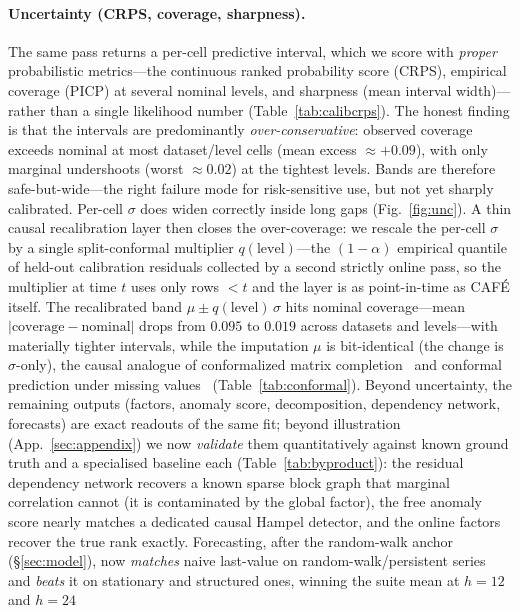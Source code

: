 \documentclass[10pt,twocolumn]{article}
\newcommand{\cafe}{CAF\'E}
\begin{document}
\paragraph{Uncertainty (CRPS, coverage, sharpness).} The same pass returns a
per-cell predictive interval, which we score with \emph{proper} probabilistic
metrics---the continuous ranked probability score (CRPS), empirical coverage
(PICP) at several nominal levels, and sharpness (mean interval width)---rather
than a single likelihood number (Table~\ref{tab:calibcrps}). The honest finding
is that the intervals are predominantly \emph{over-conservative}: observed
coverage exceeds nominal at most dataset/level cells (mean excess $\approx+0.09$),
with only marginal undershoots (worst $\approx0.02$) at the tightest levels. Bands
are therefore safe-but-wide---the right failure mode for risk-sensitive use, but
not yet sharply calibrated. Per-cell $\sigma$ does widen correctly inside long
gaps (Fig.~\ref{fig:unc}). A thin causal recalibration layer then closes the
over-coverage: we rescale the per-cell $\sigma$ by a single split-conformal
multiplier $q(\text{level})$---the $(1{-}\alpha)$ empirical quantile of held-out
calibration residuals collected by a second strictly online pass, so the multiplier
at time $t$ uses only rows ${<}t$ and the layer is as point-in-time as \cafe{} itself.
The recalibrated band $\mu\pm q(\text{level})\,\sigma$ hits nominal coverage---mean
$|\text{coverage}-\text{nominal}|$ drops from $0.095$ to $0.019$ across datasets and
levels---with materially tighter intervals, while the imputation $\mu$ is
bit-identical (the change is $\sigma$-only), the causal analogue of conformalized
matrix completion~\cite{gui2023cmc} and conformal prediction under missing
values~\cite{zaffran2023cpmv} (Table~\ref{tab:conformal}). Beyond uncertainty, the
remaining outputs (factors, anomaly score, decomposition, dependency network,
forecasts) are exact readouts of the same fit; beyond illustration
(App.~\ref{sec:appendix}) we now \emph{validate} them quantitatively against known
ground truth and a specialised baseline each (Table~\ref{tab:byproduct}): the residual
dependency network recovers a known sparse block graph that marginal correlation
cannot (it is contaminated by the global factor), the free anomaly score nearly
matches a dedicated causal Hampel detector, and the online factors recover the true
rank exactly. Forecasting, after the random-walk anchor (\S\ref{sec:model}), now
\emph{matches} naive last-value on random-walk/persistent series and \emph{beats} it on
stationary and structured ones, winning the suite mean at $h{=}12$ and $h{=}24$
\end{document}
